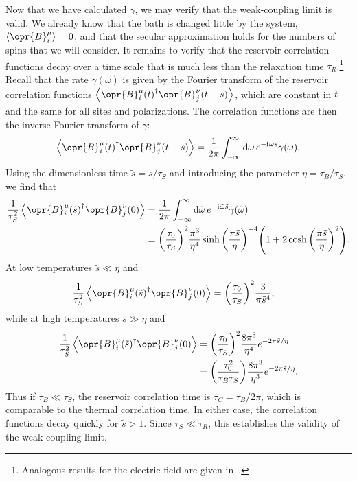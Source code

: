\documentclass[../thesis.tex]{subfiles}
\begin{document}
Now that we have calculated $\gamma$, we may verify that the weak-coupling limit
is valid. We already know that the bath is changed little by the system,
$\ev{\opr{B}_i^\mu} = 0$, and that the secular approximation holds for the
numbers of spins that we will consider. It remains to verify that the reservoir
correlation functions decay over a time scale that is much less than the
relaxation time $\tau_R$.\footnote{%
  Analogous results for the electric field are given in~\cite[p.~574]{opensys}.
}
Recall that the rate $\gamma(\omega)$ is given by the Fourier transform of the
reservoir correlation functions
$\ev{\opr{B}_i^\mu{(t)}^\dag\opr{B}_j^\nu(t-s)}$, which are constant in $t$ and
the same for all sites and polarizations. The correlation functions are then the
inverse Fourier transform of $\gamma$:
\begin{equation}
  \ev{\opr{B}_i^\mu{(t)}^\dag\opr{B}_j^\nu(t-s)}
  = \frac{1}{2\pi}\int_{-\infty}^\infty \dd{\omega} e^{-\im\omega s}
  \gamma(\omega).
\end{equation}
Using the dimensionless time $\tilde{s} = s / \tau_S$ and introducing the
parameter $\eta = \tau_B / \tau_S$, we find that
\begin{align}
  \frac{1}{\tau_S^2}\ev{\opr{B}_i^\mu{(\tilde{s})}^\dag\opr{B}_j^\nu(0)}
  &= \frac{1}{2\pi}\int_{-\infty}^\infty \dd{\tilde{\omega}}
  e^{-\im\tilde{\omega} \tilde{s}}
  \tilde{\gamma}(\tilde{\omega}) \\
  &= {\qty(\frac{\tau_0}{\tau_S})}^2 \frac{\pi^3}{\eta^4}
  \sinh{\qty(\frac{\pi \tilde{s}}{\eta})}^{-4} \qty(%
  1 + 2\cosh{\qty(\frac{\pi\tilde{s}}{\eta})}^2
  ).
\end{align}
At low temperatures $\tilde{s} \ll \eta$ and
\begin{align}
  \frac{1}{\tau_S^2}\ev{\opr{B}_i^\mu{(\tilde{s})}^\dag\opr{B}_j^\nu(0)}
  &= {\qty(\frac{\tau_0}{\tau_S})}^2 \frac{3}{\pi \tilde{s}^4},
\end{align}
while at high temperatures $\tilde{s} \gg \eta$ and
\begin{align}
  \frac{1}{\tau_S^2}\ev{\opr{B}_i^\mu{(\tilde{s})}^\dag\opr{B}_j^\nu(0)}
  &= {\qty(\frac{\tau_0}{\tau_S})}^2 \frac{8\pi^3}{\eta^4}
  e^{-2\pi\tilde{s} / \eta} \\
  &= \qty(\frac{\tau_0^2}{\tau_B \tau_S}) \frac{8\pi^3}{\eta^3}
  e^{-2\pi\tilde{s} / \eta}.
\end{align}
Thus if $\tau_B \ll \tau_S$, the reservoir correlation time is $\tau_C = \tau_B
/ 2\pi$, which is comparable to the thermal correlation time. In either case,
the correlation functions decay quickly for $\tilde{s} > 1$. Since $\tau_S \ll
\tau_R$, this establishes the validity of the weak-coupling limit.
\end{document}
